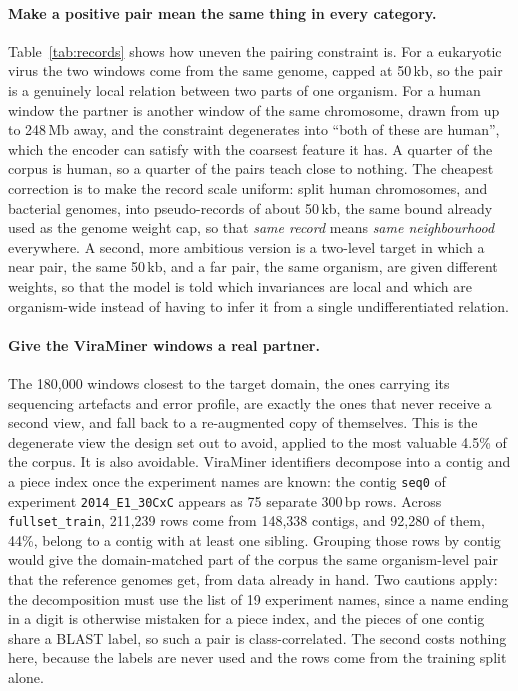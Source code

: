 \documentclass[10pt,twocolumn,a4paper]{article}
\begin{document}
\paragraph{Make a positive pair mean the same thing in every category.}
Table~\ref{tab:records} shows how uneven the pairing constraint is. For a
eukaryotic virus the two windows come from the same genome, capped at 50\,kb, so
the pair is a genuinely local relation between two parts of one organism. For a
human window the partner is another window of the same chromosome, drawn from up
to 248\,Mb away, and the constraint degenerates into ``both of these are
human'', which the encoder can satisfy with the coarsest feature it has. A
quarter of the corpus is human, so a quarter of the pairs teach close to nothing.
The cheapest correction is to make the record scale uniform: split human
chromosomes, and bacterial genomes, into pseudo-records of about 50\,kb, the same
bound already used as the genome weight cap, so that \emph{same record} means
\emph{same neighbourhood} everywhere. A second, more ambitious version is a
two-level target in which a near pair, the same 50\,kb, and a far pair, the same
organism, are given different weights, so that the model is told which
invariances are local and which are organism-wide instead of having to infer it
from a single undifferentiated relation.

\paragraph{Give the ViraMiner windows a real partner.}
The 180{,}000 windows closest to the target domain, the ones carrying its
sequencing artefacts and error profile, are exactly the ones that never receive a
second view, and fall back to a re-augmented copy of themselves. This is the
degenerate view the design set out to avoid, applied to the most valuable 4.5\%
of the corpus. It is also avoidable. ViraMiner identifiers decompose into a
contig and a piece index once the experiment names are known: the contig
\texttt{seq0} of experiment \texttt{2014\_E1\_30CxC} appears as 75 separate
300\,bp rows. Across \texttt{fullset\_train}, 211{,}239 rows come from 148{,}338
contigs, and 92{,}280 of them, 44\%, belong to a contig with at least one
sibling. Grouping those rows by contig would give the domain-matched part of the
corpus the same organism-level pair that the reference genomes get, from data
already in hand. Two cautions apply: the decomposition must use the list of 19
experiment names, since a name ending in a digit is otherwise mistaken for a
piece index, and the pieces of one contig share a BLAST label, so such a pair is
class-correlated. The second costs nothing here, because the labels are never
used and the rows come from the training split alone.
\end{document}
